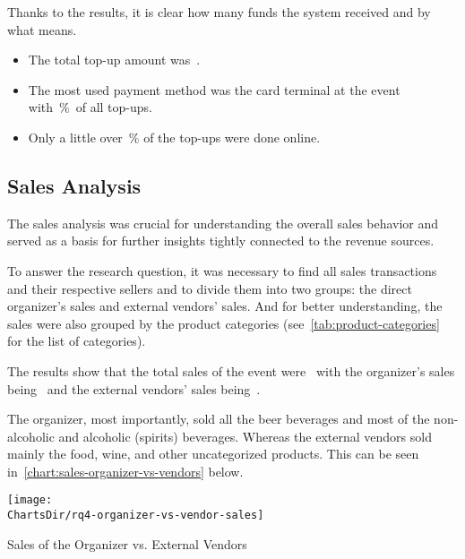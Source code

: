 Thanks to the results, it is clear how many funds the system received and by what means.

\begin{keytakeaways}
	\begin{itemize}
		\item The total top-up amount was~.
		\item The most used payment method was the card terminal at the event with~\%~of all top-ups.
		\item Only a little over~\% of the top-ups were done online.
	\end{itemize}
\end{keytakeaways}


\subsection{Sales Analysis}
\label{subsec:analysis-sales}


The sales analysis was crucial for understanding the overall sales behavior and served as a basis for further insights tightly connected to the revenue sources.

To answer the research question, it was necessary to find all sales transactions and their respective sellers and to divide them into two groups: the direct organizer's sales and external vendors' sales.
And for better understanding, the sales were also grouped by the product categories (see~\autoref{tab:product-categories} for the list of categories).

The results show that the total sales of the event were~ with the organizer's sales being~ and the external vendors' sales being~.

The organizer, most importantly, sold all the beer beverages and most of the non-alcoholic and alcoholic (spirits) beverages.
Whereas the external vendors sold mainly the food, wine, and other uncategorized products.
This can be seen in~\autoref{chart:sales-organizer-vs-vendors} below.

\begin{chart}[h]
	\centering
	\texttt{[image: \\ChartsDir/rq4-organizer-vs-vendor-sales]}
	\caption{ Sales of the Organizer vs. External Vendors}
	\label{chart:sales-organizer-vs-vendors}
	\source
\end{chart}


